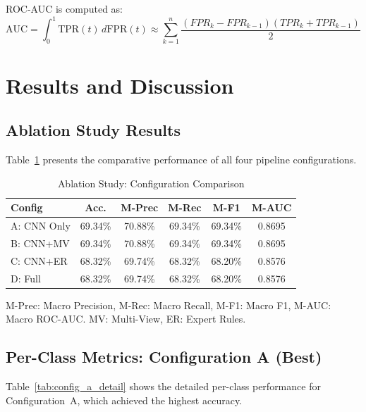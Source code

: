 \documentclass[conference]{IEEEtran}
\begin{document}
ROC-AUC is computed as:
\begin{equation}
\text{AUC} = \int_0^1 \text{TPR}(t) \, d\text{FPR}(t) \approx \sum_{k=1}^{n} \frac{(FPR_k - FPR_{k-1})(TPR_k + TPR_{k-1})}{2}
\end{equation}

\section{Results and Discussion}

\subsection{Ablation Study Results}

Table~\ref{tab:ablation_results} presents the comparative performance of all four pipeline configurations.

\begin{table}[h]
\centering
\caption{Ablation Study: Configuration Comparison}
\label{tab:ablation_results}
\begin{tabular}{lccccc}
\toprule
\textbf{Config} & \textbf{Acc.} & \textbf{M-Prec} & \textbf{M-Rec} & \textbf{M-F1} & \textbf{M-AUC} \\
\midrule
A: CNN Only & 69.34\% & 70.88\% & 69.34\% & 69.34\% & 0.8695 \\
B: CNN+MV & 69.34\% & 70.88\% & 69.34\% & 69.34\% & 0.8695 \\
C: CNN+ER & 68.32\% & 69.74\% & 68.32\% & 68.20\% & 0.8576 \\
D: Full & 68.32\% & 69.74\% & 68.32\% & 68.20\% & 0.8576 \\
\bottomrule
\end{tabular}
\vspace{0.1cm}

\scriptsize{M-Prec: Macro Precision, M-Rec: Macro Recall, M-F1: Macro F1, M-AUC: Macro ROC-AUC. MV: Multi-View, ER: Expert Rules.}
\end{table}

\subsection{Per-Class Metrics: Configuration A (Best)}

Table~\ref{tab:config_a_detail} shows the detailed per-class performance for Configuration~A, which achieved the highest accuracy.
\end{document}
